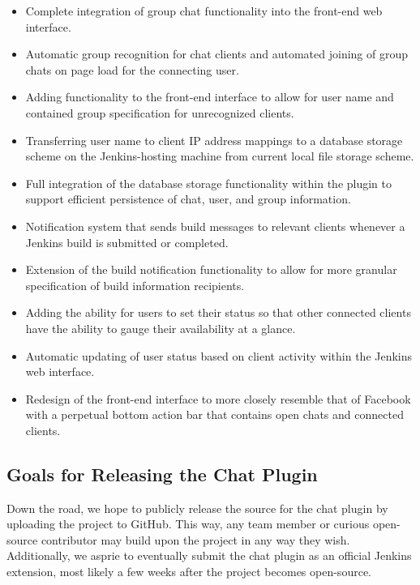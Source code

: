 \documentclass{article}
\begin{document}
		\begin{itemize}
			\item Complete integration of group chat functionality into the
			front-end web interface.
			\item Automatic group recognition for chat clients and automated 
			joining of group chats on page load for the connecting user.
			\item Adding functionality to the front-end interface to allow for
			user name and contained group specification for unrecognized clients.
			\item Transferring user name to client IP address mappings to a 
			database storage scheme on the Jenkins-hosting machine from current 
			local file storage scheme.
			\item Full integration of the database storage functionality within
			the plugin to support efficient persistence of chat, user, and
			group information.
			\item Notification system that sends build messages to relevant clients
			whenever a Jenkins build is submitted or completed. 
			\item Extension of the build notification functionality to allow for
			more granular specification of build information recipients.
			\item Adding the ability for users to set their status so that other
			connected clients have the ability to gauge their availability at
			a glance.
			\item Automatic updating of user status based on client activity
			within the Jenkins web interface.
			\item Redesign of the front-end interface to more closely resemble
			that of Facebook with a perpetual bottom action bar that contains
			open chats and connected clients.
		\end{itemize}

		\subsection[Project Publication]{Goals for Releasing the Chat Plugin}
		Down the road, we hope to publicly release the source for the chat
		plugin by uploading the project to GitHub.  This way, any team member
		or curious open-source contributor may build upon the project in any
		way they wish.  Additionally, we asprie to eventually submit the
		chat plugin as an official Jenkins extension, most likely a few weeks
		after the project becomes open-source.
\end{document}
